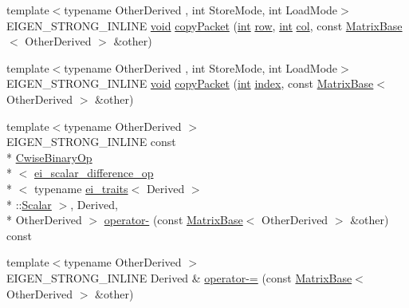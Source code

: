 \begin{DoxyCompactItemize}
\item 
{\footnotesize template$<$typename Other\-Derived , int Store\-Mode, int Load\-Mode$>$ }\\E\-I\-G\-E\-N\-\_\-\-S\-T\-R\-O\-N\-G\-\_\-\-I\-N\-L\-I\-N\-E \hyperlink{group___u_a_v_objects_plugin_ga444cf2ff3f0ecbe028adce838d373f5c}{void} \hyperlink{class_matrix_base_a72bce4300e6fd0e2bcb3e9a8feedcb36}{copy\-Packet} (\hyperlink{ioapi_8h_a787fa3cf048117ba7123753c1e74fcd6}{int} \hyperlink{glext_8h_a11b277b422822f784ee248b43eee3e1e}{row}, \hyperlink{ioapi_8h_a787fa3cf048117ba7123753c1e74fcd6}{int} \hyperlink{class_matrix_base_ae3c94b0f25b4273c7a8125169bdf60e0}{col}, const \hyperlink{class_matrix_base}{Matrix\-Base}$<$ Other\-Derived $>$ \&other)
\item 
{\footnotesize template$<$typename Other\-Derived , int Store\-Mode, int Load\-Mode$>$ }\\E\-I\-G\-E\-N\-\_\-\-S\-T\-R\-O\-N\-G\-\_\-\-I\-N\-L\-I\-N\-E \hyperlink{group___u_a_v_objects_plugin_ga444cf2ff3f0ecbe028adce838d373f5c}{void} \hyperlink{class_matrix_base_aeb22e3de362451df970cb71432bdcdbc}{copy\-Packet} (\hyperlink{ioapi_8h_a787fa3cf048117ba7123753c1e74fcd6}{int} \hyperlink{glext_8h_ab47dd9958bcadea08866b42bf358e95e}{index}, const \hyperlink{class_matrix_base}{Matrix\-Base}$<$ Other\-Derived $>$ \&other)
\item 
{\footnotesize template$<$typename Other\-Derived $>$ }\\E\-I\-G\-E\-N\-\_\-\-S\-T\-R\-O\-N\-G\-\_\-\-I\-N\-L\-I\-N\-E const \\*
\hyperlink{class_cwise_binary_op}{Cwise\-Binary\-Op}\\*
$<$ \hyperlink{structei__scalar__difference__op}{ei\-\_\-scalar\-\_\-difference\-\_\-op}\\*
$<$ typename \hyperlink{structei__traits}{ei\-\_\-traits}$<$ Derived $>$\\*
\-::\hyperlink{class_matrix_base_a625df8339dc2d816cbc0fd66e7dadaf5}{Scalar} $>$, Derived, \\*
Other\-Derived $>$ \hyperlink{class_matrix_base_a8968a86d8204a62ae809dd8e5b38123f}{operator-\/} (const \hyperlink{class_matrix_base}{Matrix\-Base}$<$ Other\-Derived $>$ \&other) const 
\item 
{\footnotesize template$<$typename Other\-Derived $>$ }\\E\-I\-G\-E\-N\-\_\-\-S\-T\-R\-O\-N\-G\-\_\-\-I\-N\-L\-I\-N\-E Derived \& \hyperlink{class_matrix_base_ab8910d40ebb8b55f47f39f2840b19ea9}{operator-\/=} (const \hyperlink{class_matrix_base}{Matrix\-Base}$<$ Other\-Derived $>$ \&other)

\end{DoxyCompactItemize}
